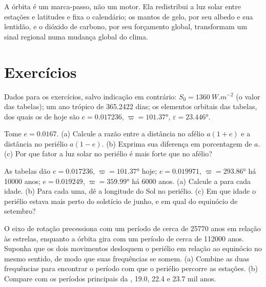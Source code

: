 A órbita é um marca-passo, não um motor. Ela redistribui a luz solar entre estações e latitudes
e fixa o calendário; os mantos de gelo, por seu albedo e sua lentidão, e o dióxido de carbono, por
seu forçamento global, transformam um sinal regional numa mudança global do clima.

\section*{Exercícios}\label{sec:b2:orbital-forcing:exercises}

Dados para os exercícios, salvo indicação em contrário: $S_0 = \qty{1360}{W.m^{-2}}$ (o valor das
tabelas); um ano trópico de \num{365.2422} dias; os elementos orbitais das tabelas, dos quais os de hoje são
$e = 0.017236$, $\varpi = \ang{101.37}$, $\varepsilon = \ang{23.446}$.

\begin{exercise}[$\star$]\label{exo:b2:orbital-forcing:1}
Tome $e = 0.0167$. (a) Calcule a razão entre a distância no afélio $a(1 + e)$ e a distância no
periélio $a(1 - e)$. (b) Exprima sua diferença em porcentagem de $a$. (c) Por que fator
a luz solar no periélio é mais forte que no afélio?
\end{exercise}

\begin{exercise}[$\star$]\label{exo:b2:orbital-forcing:2}
As tabelas dão $e = 0.017236$, $\varpi = \ang{101.37}$ hoje; $e = 0.019971$, $\varpi =
\ang{293.86}$ há \num{10000} anos; $e = 0.019249$, $\varpi = \ang{359.99}$ há \num{6000} anos.
(a) Calcule a  para cada idade. (b) Para cada uma, dê a longitude do Sol no
periélio. (c) Em que idade o periélio estava mais perto do solstício de junho, e em qual do
equinócio de setembro?
\end{exercise}

\begin{exercise}[$\star$]\label{exo:b2:orbital-forcing:3}
O eixo de rotação precessiona com um período de cerca de \num{25770} anos em relação às estrelas, enquanto
a órbita gira com um período de cerca de \num{112000} anos. Suponha que os dois movimentos desloquem o
periélio em relação ao equinócio no mesmo sentido, de modo que suas frequências se somem. (a) Combine
as duas frequências para encontrar o período com que o periélio
percorre as estações. (b) Compare com os períodos principais da , \num{19.0},
\num{22.4} e \num{23.7} mil anos.
\end{exercise}


